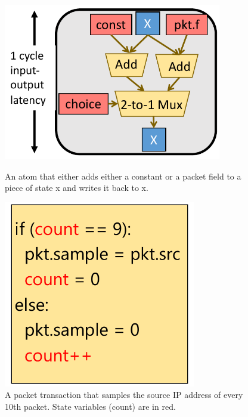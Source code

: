 \begin{figure}[!t]
\begin{minipage}{0.48\textwidth}
\centering
\vspace{0.38in}
\includegraphics[width=0.85\textwidth]{atom.pdf}
\caption{An atom that either adds either a constant or a packet field to a
piece of state x and writes it back to x.}
\label{fig:simple_atom}
\end{minipage}
\hfill
\begin{minipage}{0.48\textwidth}
\centering
\includegraphics[width=0.75\textwidth]{packet_transaction.pdf}
\caption{A packet transaction that samples the source IP address of every 10th
packet. State variables (count) are in red.}
\label{fig:simple_transaction}
\end{minipage}
\end{figure}

